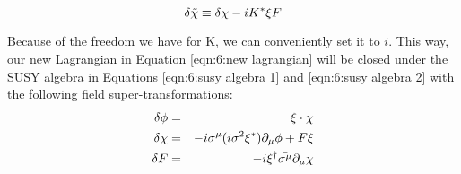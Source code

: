 \begin{equation}
    \delta \Tilde{\chi} \equiv \delta \chi - i K^* \xi F
    \label{eqn:6:new spinor field}
\end{equation}

Because of the freedom we have for K, we can conveniently set it to $i$. This way, our new Lagrangian in Equation \ref{eqn:6:new lagrangian} will be closed under the SUSY algebra in Equations \ref{eqn:6:susy algebra 1} and \ref{eqn:6:susy algebra 2} with the following field super-transformations:
\begin{eqnarray}
    \delta \phi &=& \xi \cdot\chi \nonext
    \delta \chi &=& - i \sigma^\mu (i \sigma^2 \xi^*) \partial_\mu \phi + F\xi \label{eqn:6:supersymmetric field transformations} \\
    \delta F &=& -i \xi^\dagger \Bar{\sigma^\mu} \partial_\mu \chi \nonumber
\end{eqnarray}
